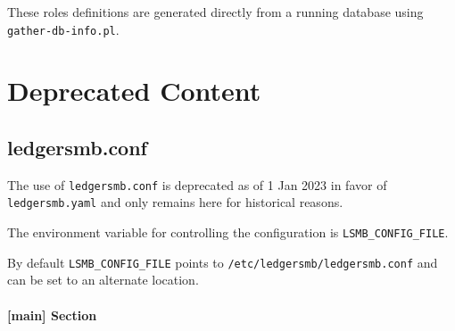 
\ifpdf
      \newcommand{\htmlspacing}{}
\else
      \newcommand{\htmlspacing}{ \hfill \\}
\fi

These roles definitions are generated directly from a running database using  \texttt{gather-db-info.pl}.



\chapter{Deprecated Content}
\label{app-deprecated-content}

\section{ledgersmb.conf}
\label{app-deprecated-ledgersmb-conf}

The use of \texttt{ledgersmb.conf}  is deprecated as of 1 Jan 2023 in favor of \texttt{ledgersmb.yaml}  and only remains here for historical reasons.  

The environment variable for controlling the configuration is \texttt{LSMB\_CONFIG\_FILE}.

By default \texttt{LSMB\_CONFIG\_FILE} points to \texttt{/etc/ledgersmb/ledgersmb.conf} and can be set to an alternate location.

\subsubsection{[main] Section}
\label{subsubsec-global-config-ledgersmb-conf-general}

